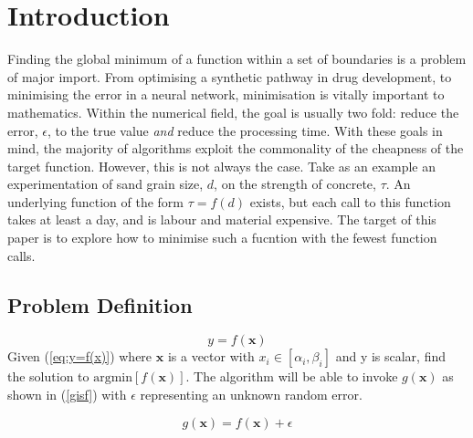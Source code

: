 
\chapter{Introduction}  %

\ifpdf
    \graphicspath{{Chapter1/Figs/Raster/}{Chapter1/Figs/PDF/}{Chapter1/Figs/}}
\else
    \graphicspath{{Chapter1/Figs/Vector/}{Chapter1/Figs/}}
\fi

Finding the global minimum of a function within a set of boundaries is a problem of major import. From optimising a synthetic pathway in drug development, to minimising the error in a neural network, minimisation is vitally important to mathematics. Within the numerical field, the goal is usually two fold: reduce the error, $\epsilon$, to the true value \textit{and} reduce the processing time. With these goals in mind, the majority of algorithms exploit the commonality of the cheapness of the target function. However, this is not always the case. Take as an example an experimentation of sand grain size, $d$, on the strength of concrete, $\tau$. An underlying function of the form $\tau=f(d)$ exists, but each call to this function takes at least a day, and is labour and material expensive. The target of this paper is to explore how to minimise such a fucntion with the fewest function calls.
 
\section{Problem Definition}
\begin{equation}
    \label{eq:y=f(x)}
    y=f(\bm{x})
\end{equation}
Given (\ref{eq:y=f(x)}) where $\bm{x}$ is a vector with $x_i\in[\alpha_i, \beta_i]$ and y is scalar, find the solution to $\text{argmin}[f(\bm{x})]$. The algorithm will be able to invoke $g(\bm{x})$ as shown in (\ref{gisf}) with $\epsilon$ representing an unknown random error.

\begin{equation}
    \label{gisf}
    g(\bm{x}) = f(\bm{x}) + \epsilon
\end{equation}

